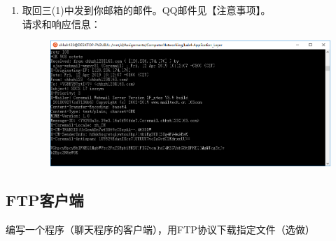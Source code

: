 \documentclass[logo,reportComp]{thesis}
\begin{document}
\begin{enumerate}
\item 取回三(1)中发到你邮箱的邮件。QQ邮件见【注意事项】。\\
请求和响应信息：
\begin{figure}[H]
\centering
\includegraphics[width=0.8\linewidth]{fig/pop-4.PNG}
\end{figure}

\end{enumerate}

\subsection{FTP客户端}
编写一个程序（聊天程序的客户端），用FTP协议下载指定文件（选做）
\end{document}

